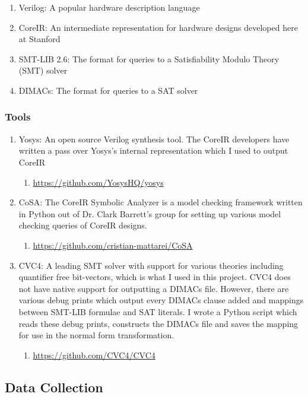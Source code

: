 \documentclass[letterpaper]{article} %
\begin{document}
\begin{enumerate}
\item Verilog: A popular hardware description language
\item CoreIR: An intermediate representation for hardware designs developed here at Stanford
\item SMT-LIB 2.6: The format for queries to a Satisfiability Modulo Theory (SMT) solver
\item DIMACs: The format for queries to a SAT solver
\end{enumerate}

\subsubsection{Tools}

\begin{enumerate}
\item Yosys: An open source Verilog synthesis tool. The CoreIR developers have written a pass over Yosys's internal representation which I used to output CoreIR
\begin{enumerate}
\item \url{https://github.com/YosysHQ/yosys}
\end{enumerate}
\item CoSA: The CoreIR Symbolic Analyzer is a model checking framework written in Python out of Dr. Clark Barrett's group for setting up various model checking queries of CoreIR designs.
\begin{enumerate}
\item \url{https://github.com/cristian-mattarei/CoSA}
\end{enumerate}
\item CVC4: A leading SMT solver with support for various theories including quantifier free bit-vectors, which is what I used in this project. CVC4 does not have native support for outputting a DIMACs file. However, there are various debug prints which output every DIMACs clause added and mappings between SMT-LIB formulae and SAT literals. I wrote a Python script which reads these debug prints, constructs the DIMACs file and saves the mapping for use in the normal form transformation.
\begin{enumerate}
\item \url{https://github.com/CVC4/CVC4}
\end{enumerate}
\end{enumerate}

\subsection{Data Collection}
\end{document}
